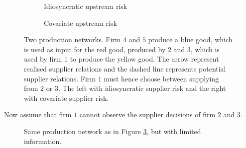 \documentclass[../main.tex]{subfiles}
\begin{document}
\begin{figure}[ht]
  \centering
  \begin{subfigure}{.5\textwidth}
    \centering
    \caption{Idiosyncratic upstream risk}
    \label{fig:example:idio}  
  \end{subfigure}%
  \begin{subfigure}{.5\textwidth}
    \centering
    \caption{Covariate upstream risk}
    \label{fig:example:cov}
  \end{subfigure}
  \caption{Two production networks. Firm $4$ and $5$ produce a blue good, which is used as input for the red good, produced by $2$ and $3$, which is used by firm $1$ to produce the yellow good. The arrow represent realised supplier relations and the dashed line represents potential supplier relations. Firm $1$ must hence choose between supplying from $2$ or $3$. The left with idiosyncratic supplier risk and the right with covariate supplier risk.}
  \label{fig:example}
\end{figure}

Now assume that firm $1$ cannot observe the supplier decisions of firm $2$ and $3$. 

\begin{figure}[ht]
  \centering
  \caption{Same production network as in Figure \ref{fig:example}, but with limited information.}
  \label{fig:example:unknown}  
\end{figure}
\end{document}
